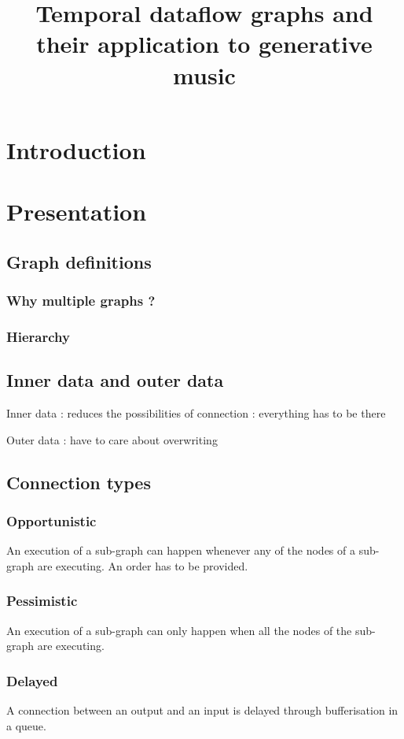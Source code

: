 \documentclass[a4paper,twocolumns]{article}
\title{Temporal dataflow graphs and their application to generative music}
\begin{document}
	\maketitle
	
	\section{Introduction}
	\section{Presentation}
	\subsection{Graph definitions}
	\subsubsection{Why multiple graphs ?}
	\subsubsection{Hierarchy}
	
	\subsection{Inner data and outer data}
	Inner data : reduces the possibilities of connection : everything has to be there
	
	Outer data : have to care about overwriting
	
	\subsection{Connection types}
	\subsubsection{Opportunistic}
	An execution of a sub-graph can happen whenever any of the nodes of a sub-graph are executing. 
	An order has to be provided.
	\subsubsection{Pessimistic}
	An execution of a sub-graph can only happen when all the nodes of the sub-graph are executing.
	\subsubsection{Delayed}
	A connection between an output and an input is delayed through bufferisation in a queue.
	
\end{document}
